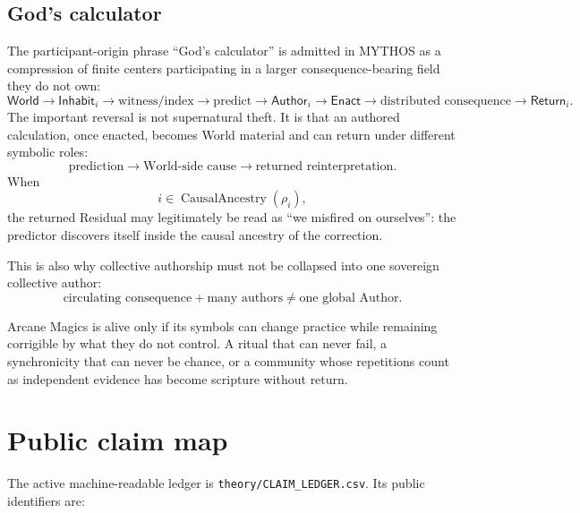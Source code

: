 \documentclass[11pt]{article}
\begin{document}
\subsection{God's calculator}

The participant-origin phrase ``God's calculator'' is admitted in MYTHOS as a
compression of finite centers participating in a larger consequence-bearing
field they do not own:
\[
\mathsf{World}\to\mathsf{Inhabit}_i\to\text{witness/index}
\to\text{predict}\to\mathsf{Author}_i\to\mathsf{Enact}
\to\text{distributed consequence}\to\mathsf{Return}_i.
\]
The important reversal is not supernatural theft. It is that an authored
calculation, once enacted, becomes World material and can return under different
symbolic roles:
\[
\boxed{\text{prediction}\to\text{World-side cause}
\to\text{returned reinterpretation}.}
\]
When
\[
i\in\operatorname{CausalAncestry}(\rho_i),
\]
the returned Residual may legitimately be read as ``we misfired on ourselves'':
the predictor discovers itself inside the causal ancestry of the correction.

This is also why collective authorship must not be collapsed into one sovereign
collective author:
\[
\boxed{\text{circulating consequence}+\text{many authors}
\neq\text{one global Author}.}
\]

\begin{cruxbox}
Arcane Magics is alive only if its symbols can change practice while remaining
corrigible by what they do not control. A ritual that can never fail, a
synchronicity that can never be chance, or a community whose repetitions count
as independent evidence has become scripture without return.
\end{cruxbox}

\appendix
\section{Public claim map}

The active machine-readable ledger is \texttt{theory/CLAIM\_LEDGER.csv}. Its public identifiers are:
\end{document}
